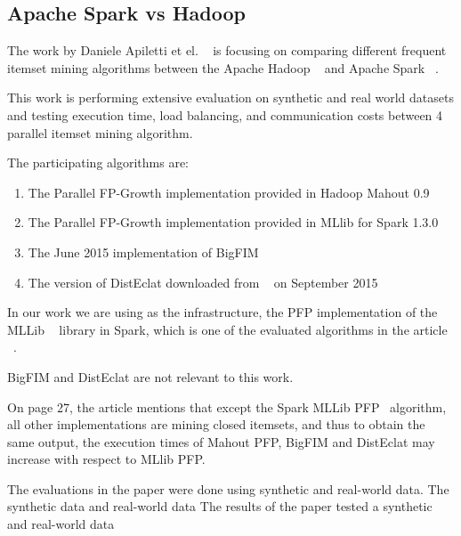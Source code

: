 \subsection{Apache Spark vs Hadoop}
\label{sec:sparkvhadoop}
The work by Daniele Apiletti et el. ~\cite{APILETTI201767} is focusing on comparing different frequent itemset mining algorithms between the Apache Hadoop ~\cite{hadoop} and Apache Spark ~\cite{spark}.

This work is performing extensive evaluation on synthetic and real world datasets and testing execution time, load balancing, and communication costs between 4 parallel itemset mining algorithm.

The participating algorithms are:
\begin{enumerate}
\item The Parallel FP-Growth implementation provided in Hadoop  Mahout 0.9 ~\cite{mahoot}
\item The Parallel FP-Growth implementation provided in MLlib for Spark
1.3.0 ~\cite{mllib}
\item The June 2015 implementation of BigFIM ~\cite{bigfim} 
\item The version of DistEclat downloaded from ~\cite{bigfim} on September 2015
\end{enumerate}
In our work we are using as the infrastructure, the PFP implementation of the MLLib ~\cite{mllib}  library in Spark,  which is one of the evaluated algorithms in the article ~\cite{APILETTI201767}.

BigFIM and DistEclat are not relevant to this work.

On page 27, the article mentions that except the Spark MLLib PFP~\cite{mllib} algorithm, all other implementations are mining closed itemsets,  and thus to obtain the
same output, the execution times of Mahout PFP, BigFIM and DistEclat may increase
with respect to MLlib PFP.

The evaluations in the paper were done using synthetic and real-world data.
The synthetic data and real-world data 
The results of the paper tested a synthetic and real-world data 



